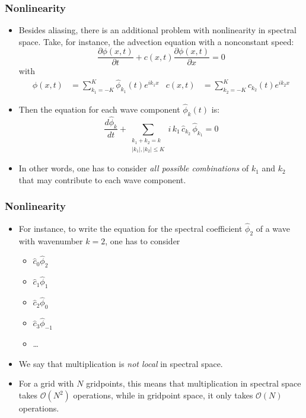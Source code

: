\documentclass[aspectratio=43,9pt]{beamer}
\begin{document}
\begin{frame}
	\frametitle{Nonlinearity}
	\vfill\begin{itemize}
		\item Besides aliasing, there is an additional problem with nonlinearity in spectral space. Take, for instance, the advection equation with a nonconstant speed:
			\begin{equation*}
				\frac{\partial \phi(x,t)}{\partial t}+c(x,t)\frac{\partial \phi(x,t)}{\partial x}=0
			\end{equation*}
			with
			\begin{align*}
				 \phi(x,t) &= \sum_{k_1=-K}^K \hat\phi_{k_1} (t) e^{ik_1x}	&	c(x,t) &= \sum_{k_2=-K}^K \hat c_{k_2} (t) e^{ik_2x}
			\end{align*}\vfill
		\item Then the equation for each wave component $\hat\phi_k(t)$ is:
			\begin{equation*}
				\frac{ d \hat\phi_{k}}{dt} + \sum_{\begin{array}{c} k_1+k_2=k \\ |k_1|,|k_2|\le K \end{array} } i\,k_1\,\hat c_{k_2}\,\hat\phi_{k_1} = 0
			\end{equation*}\vfill
		\item In other words, one has to consider \emph{all possible combinations} of $k_1$ and $k_2$ that may contribute to each wave component.
	\end{itemize}\vfill
\end{frame}
%
%
\begin{frame}
	\frametitle{Nonlinearity}
	\vfill\begin{itemize}
		\item For instance, to write the equation for the spectral coefficient $\hat\phi_2$ of a wave with wavenumber $k=2$, one has to consider
			\begin{itemize}
				\item $\hat c_0	\hat \phi_2$
				\item $\hat c_1 \hat\phi_1$
				\item $\hat c_2 \hat\phi_0$
				\item $\hat c_3 \hat\phi_{-1}$
				\item \ldots
			\end{itemize}\vfill
		\item We say that multiplication is \emph{not local} in spectral space.\vfill
\pause
		\item For a grid with $N$ gridpoints, this means that multiplication in spectral space takes $\mathcal{O}(N^2)$ operations, while in gridpoint space, it only takes $\mathcal{O}(N)$ operations.
	\end{itemize}\vfill
\end{frame}
\end{document}
